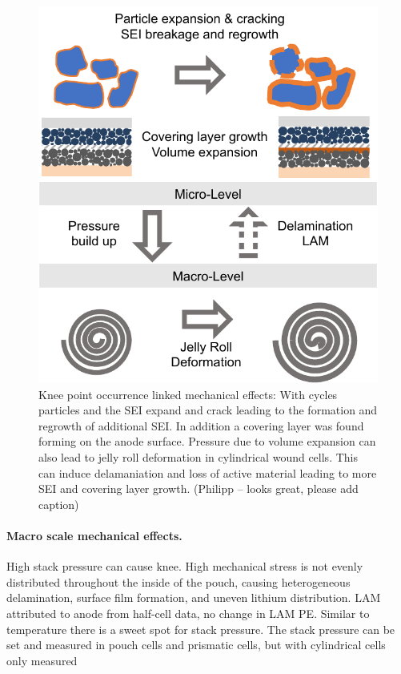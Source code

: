\documentclass{article}
\begin{document}
\begin{figure}[ht]
\centering
\includegraphics[scale = 0.7]{figures/MechanicalKneepoints.pdf}
\caption{Knee point occurrence linked mechanical effects: With cycles particles and the SEI expand and crack leading to the formation and regrowth of additional SEI. In addition a covering layer was found forming on the anode surface. Pressure due to volume expansion can also lead to jelly roll deformation in cylindrical wound cells. This can induce delamaniation and loss of active material leading to more SEI and covering layer growth. (Philipp -- looks great, please add caption)}
\label{fig:knee_mechanical}
\end{figure}

\paragraph{Macro scale mechanical effects.}

High stack pressure can cause knee. High mechanical stress is not evenly distributed throughout the inside of the pouch, causing heterogeneous delamination, surface film formation, and uneven lithium distribution. LAM attributed to anode from half-cell data, no change in LAM PE. Similar to temperature there is a sweet spot for stack pressure\cite{cannarella_stress_2014}. The stack pressure can be set and measured in pouch cells \cite{wunsch_investigation_2019} and prismatic cells\cite{cannarella_stress_2014}, but  with cylindrical cells only measured\cite{willenberg_high-precision_2020}
\end{document}
